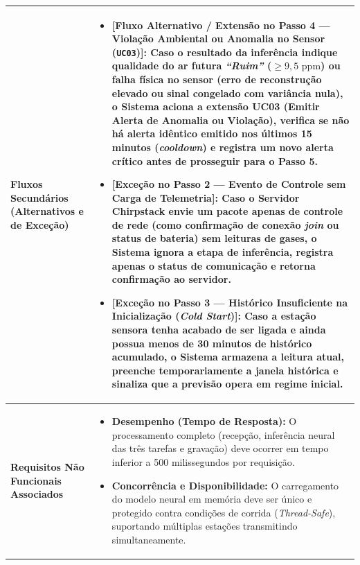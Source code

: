 \documentclass[11pt, a4paper]{article}
\begin{document}
\begin{longtable}{|>{\bfseries}p{3.8cm}|p{12.4cm}|}
Fluxos Secundários (Alternativos e de Exceção) & 
\begin{itemize}[nosep, leftmargin=0.5cm]
    \item \textbf{[Fluxo Alternativo / Extensão no Passo 4 --- Violação Ambiental ou Anomalia no Sensor (\texttt{UC03})]:} Caso o resultado da inferência indique qualidade do ar futura \emph{``Ruim''} ($\ge 9{,}5\textrm{ ppm}$) ou falha física no sensor (erro de reconstrução elevado ou sinal congelado com variância nula), o \textbf{Sistema} aciona a extensão \textbf{UC03 (Emitir Alerta de Anomalia ou Violação)}, verifica se não há alerta idêntico emitido nos últimos 15 minutos (\emph{cooldown}) e registra um novo alerta crítico antes de prosseguir para o Passo 5.
    \item \textbf{[Exceção no Passo 2 --- Evento de Controle sem Carga de Telemetria]:} Caso o \textbf{Servidor Chirpstack} envie um pacote apenas de controle de rede (como confirmação de conexão \emph{join} ou status de bateria) sem leituras de gases, o \textbf{Sistema} ignora a etapa de inferência, registra apenas o status de comunicação e retorna confirmação ao servidor.
    \item \textbf{[Exceção no Passo 3 --- Histórico Insuficiente na Inicialização (\emph{Cold Start})]:} Caso a estação sensora tenha acabado de ser ligada e ainda possua menos de 30 minutos de histórico acumulado, o \textbf{Sistema} armazena a leitura atual, preenche temporariamente a janela histórica e sinaliza que a previsão opera em regime inicial.
\end{itemize} \\ \hline

Requisitos Não Funcionais Associados & 
\begin{itemize}[nosep, leftmargin=0.5cm]
    \item \textbf{Desempenho (Tempo de Resposta):} O processamento completo (recepção, inferência neural das três tarefas e gravação) deve ocorrer em tempo inferior a 500 milissegundos por requisição.
    \item \textbf{Concorrência e Disponibilidade:} O carregamento do modelo neural em memória deve ser único e protegido contra condições de corrida (\emph{Thread-Safe}), suportando múltiplas estações transmitindo simultaneamente.
\end{itemize} \\ \hline
\end{longtable}

\end{document}
